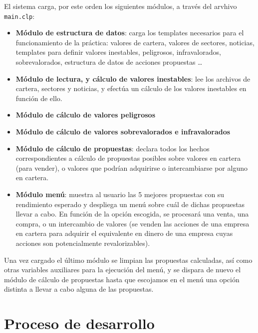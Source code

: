 \documentclass[a4paper,11pt]{article}
\begin{document}
El sistema carga, por este orden los siguientes módulos, a través del arvhivo \texttt{main.clp}:

\begin{itemize}
  \item \textbf{Módulo de estructura de datos}: carga los templates necesarios para el funcionamiento de la práctica: valores de cartera,
  valores de sectores, noticias, templates para definir valores inestables, peligrosos, infravalorados, sobrevalorados,
  estructura de datos de acciones propuestas \ldots

  \item \textbf{Módulo de lectura, y cálculo de valores inestables}: lee los archivos de cartera, sectores y noticias, y
  efectúa un cálculo de los valores inestables en función de ello.

  \item \textbf{Módulo de cálculo de valores peligrosos}
  
  \item \textbf{Módulo de cálculo de valores sobrevalorados e infravalorados}
  
  \item \textbf{Módulo de cálculo de propuestas}: declara todos los hechos correspondientes a cálculo de
  propuestas posibles sobre valores en cartera (para vender), o valores que podrían adquirirse o intercambiarse por alguno en cartera.
  
  \item \textbf{Módulo menú}: muestra al usuario las 5 mejores propuestas con su rendimiento esperado y despliega un menú 
  sobre cuál de dichas propuestas llevar a cabo. En función de la opción escogida, se procesará una venta, una compra, o un
  intercambio de valores (se venden las acciones de una empresa en cartera para adquirir el equivalente en dinero de una
  empresa cuyas acciones son potencialmente revalorizables).
\end{itemize}

Una vez cargado el último módulo se limpian las propuestas calculadas, así como otras variables auxiliares para la ejecución
del menú, y se dispara de nuevo el módulo de cálculo de propuestas hasta que escojamos en el menú una opción distinta a
llevar a cabo alguna de las propuestas.

\section{Proceso de desarrollo}
\end{document}
